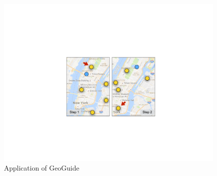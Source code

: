 \documentclass{vldb}
\newcommand{\framework}{{\sc GeoGuide}}
\begin{document}
\begin{figure}
  \centering
  \includegraphics[width=\columnwidth]{figs/scn}
\caption{Application of \framework}
\label{fig:app}
\vspace{-10pt}
\end{figure}



\end{document}
